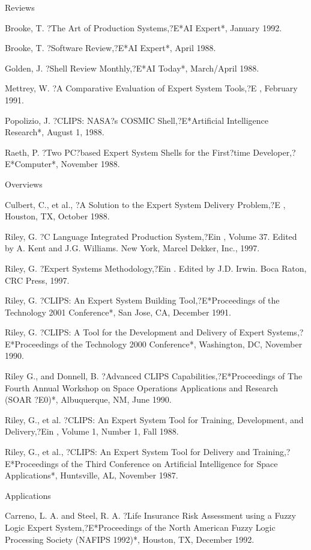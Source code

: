 \documentclass[letterpaper,10pt,english]{sphinxmanual}
\begin{document}
Reviews

Brooke, T. ?The Art of Production Systems,?E*AI Expert*, January 1992.

Brooke, T. ?Software Review,?E*AI Expert*, April 1988.

Golden, J. ?Shell Review Monthly,?E*AI Today*, March/April 1988.

Mettrey, W. ?A Comparative Evaluation of Expert System Tools,?E
, February 1991.

Popolizio, J. ?CLIPS: NASA?s COSMIC Shell,?E*Artificial Intelligence
Research*, August 1, 1988.

Raeth, P. ?Two PC?based Expert System Shells for the First?time
Developer,?E*Computer*, November 1988.

Overviews

Culbert, C., et al., ?A Solution to the Expert System Delivery Problem,?E
, Houston, TX, October 1988.

Riley, G. ?C Language Integrated Production System,?Ein , Volume 37. Edited by A. Kent and J.G.
Williams. New York, Marcel Dekker, Inc., 1997.

Riley, G. ?Expert Systems Methodology,?Ein . Edited by J.D. Irwin. Boca Raton, CRC Press, 1997.

Riley, G. ?CLIPS: An Expert System Building Tool,?E*Proceedings of the
Technology 2001 Conference*, San Jose, CA, December 1991.

Riley, G. ?CLIPS: A Tool for the Development and Delivery of Expert
Systems,?E*Proceedings of the Technology 2000 Conference*, Washington,
DC, November 1990.

Riley G., and Donnell, B. ?Advanced CLIPS Capabilities,?E*Proceedings of
The Fourth Annual Workshop on Space Operations Applications and Research
(SOAR ?E0)*, Albuquerque, NM, June 1990.

Riley, G., et al. ?CLIPS: An Expert System Tool for Training,
Development, and Delivery,?Ein , Volume 1,
Number 1, Fall 1988.

Riley, G., et al., ?CLIPS: An Expert System Tool for Delivery and
Training,?E*Proceedings of the Third Conference on Artificial
Intelligence for Space Applications*, Huntsville, AL, November 1987.

Applications

Carreno, L. A. and Steel, R. A. ?Life Insurance Risk Assessment using a
Fuzzy Logic Expert System,?E*Proceedings of the North American Fuzzy
Logic Processing Society (NAFIPS 1992)*, Houston, TX, December 1992.
\end{document}
